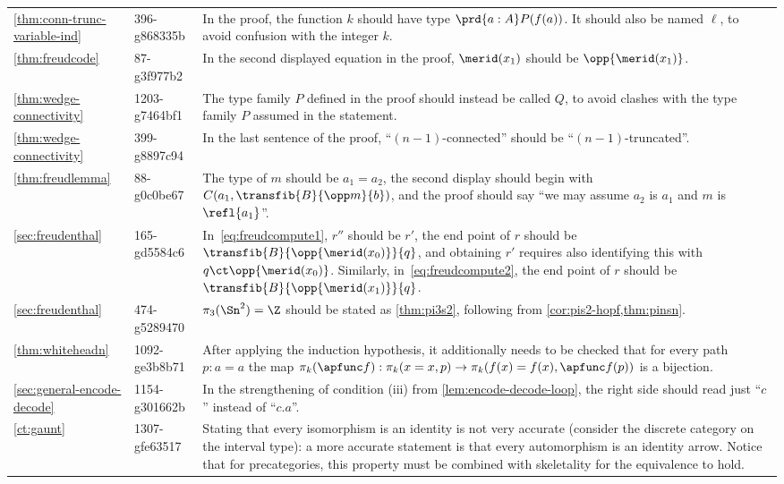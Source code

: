 \documentclass[
%
%
11pt %
]{article}
\begin{document}
\begin{longtable}{llp{10.5cm}}
  \cref{thm:conn-trunc-variable-ind}
  & 396-g868335b
  & In the proof, the function $k$ should have type $\prd{a:A} P(f(a))$.
  It should also be named $\ell$, to avoid confusion with the integer $k$.\\
  \cref{thm:freudcode}
  & 87-g3f977b2
  & In the second displayed equation in the proof, $\merid(x_1)$ should be $\opp{\merid(x_1)}$.\\
  \cref{thm:wedge-connectivity}
  & 1203-g7464bf1
  & The type family $P$ defined in the proof should instead be called $Q$, to avoid clashes with the type family $P$ assumed in the statement.\\
  \cref{thm:wedge-connectivity}
  & 399-g8897c94
  & In the last sentence of the proof, ``$(n-1)$-connected'' should be ``$(n-1)$-truncated''.\\
  \cref{thm:freudlemma}
  & 88-g0c0be67
  & The type of $m$ should be $a_1=a_2$, the second display should begin with $C(a_1,\transfib{B}{\opp m}{b})$, and the proof should say ``we may assume $a_2$ is $a_1$ and $m$ is $\refl{a_1}$''.\\
  \cref{sec:freudenthal}
  & 165-gd5584c6
  & In~\eqref{eq:freudcompute1}, $r''$ should be $r'$, the end point of $r$ should be $\transfib{B}{\opp{\merid(x_0)}}{q}$, and obtaining $r'$ requires also identifying this with $q \ct \opp{\merid(x_0)}$.
  Similarly, in~\eqref{eq:freudcompute2}, the end point of $r$ should be $\transfib{B}{\opp{\merid(x_1)}}{q}$.\\
  \cref{sec:freudenthal}
  & 474-g5289470
  & $\pi_3(\Sn^2)=\Z$ should be stated as \cref{thm:pi3s2}, following from \cref{cor:pis2-hopf,thm:pinsn}.\\
  \cref{thm:whiteheadn}
  & 1092-ge3b8b71
  & After applying the induction hypothesis, it additionally needs to be checked that for every path $p : a = a$ the map $\pi_k(\apfunc f):\pi_k(x = x,p) \to \pi_k(f(x) = f(x),\apfunc f(p))$ is a bijection. \\
  \cref{sec:general-encode-decode}
  & 1154-g301662b
  & In the strengthening of condition (iii) from \cref{lem:encode-decode-loop}, the right side should read just ``$c$'' instead of ``$c.a$''.\\
  \cref{ct:gaunt}
  & 1307-gfe63517
  & Stating that every isomorphism is an identity is not very accurate (consider the discrete category on the interval type): a more accurate statement is that every automorphism is an identity arrow. Notice that for precategories, this property must be combined with skeletality for the equivalence to hold.\\

\end{longtable}
\end{document}
